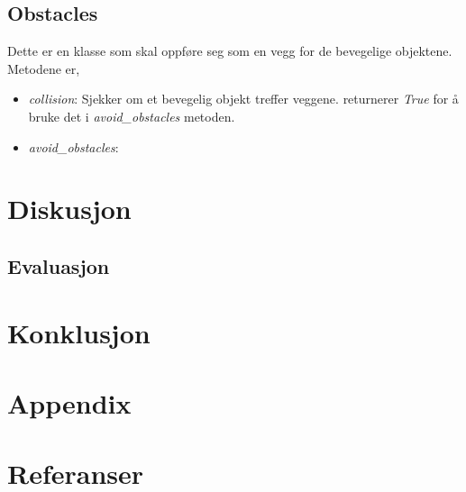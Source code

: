 {\subsection{Obstacles}
Dette er en klasse som skal oppføre seg som en vegg for de bevegelige objektene. Metodene er,

\begin{itemize}
    \item \emph{collision}: Sjekker om et bevegelig objekt treffer veggene. returnerer \emph{True} for å bruke det i \emph{avoid\_obstacles} metoden.
    \item \emph{avoid\_obstacles}: 
\end{itemize}

\section{Diskusjon}



\subsection{Evaluasjon}

\section{Konklusjon}

\newpage
\section{Appendix}
\section{Referanser}
\begingroup
\renewcommand{\section}[2]{}%


\endgroup



 







